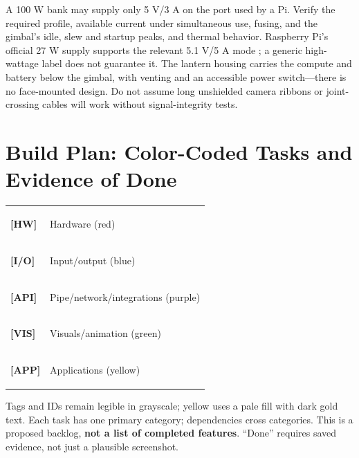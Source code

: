 \documentclass[11pt,a4paper]{article}
\newcommand{\tagHW}{\colorbox{HW!12}{\textcolor{HW}{\strut\textbf{[HW]}}}}
\newcommand{\tagIO}{\colorbox{IO!12}{\textcolor{IO}{\strut\textbf{[I/O]}}}}
\newcommand{\tagAPI}{\colorbox{API!12}{\textcolor{API}{\strut\textbf{[API]}}}}
\newcommand{\tagVIS}{\colorbox{VIS!12}{\textcolor{VIS}{\strut\textbf{[VIS]}}}}
\newcommand{\tagAPP}{\colorbox{APPfill}{\textcolor{APP}{\strut\textbf{[APP]}}}}
\begin{document}
A 100 W bank may supply only 5 V/3 A on the port used by a Pi.
Verify the required profile, available current under simultaneous use,
fusing, and the gimbal's idle, slew and startup peaks, and thermal
behavior.
Raspberry Pi's official 27 W supply supports the relevant 5.1 V/5 A mode
\cite{pi-power}; a generic high-wattage label does not guarantee it.
The lantern housing carries the compute and battery below the gimbal, with
venting and an accessible power switch---there is no face-mounted design.
Do not assume long unshielded camera ribbons or joint-crossing cables will
work without signal-integrity tests.

\section{Build Plan: Color-Coded Tasks and Evidence of Done}
\label{sec:tasks}

\begin{tabularx}{\linewidth}{@{}lX@{}}
\tagHW & Hardware (red)\\
\tagIO & Input/output (blue)\\
\tagAPI & Pipe/network/integrations (purple)\\
\tagVIS & Visuals/animation (green)\\
\tagAPP & Applications (yellow)\\
\end{tabularx}

Tags and IDs remain legible in grayscale; yellow uses a pale fill with dark
gold text. Each task has one primary category; dependencies cross categories.
This is a proposed backlog, \textbf{not a list of completed features}.
``Done'' requires saved evidence, not just a plausible screenshot.
\end{document}
